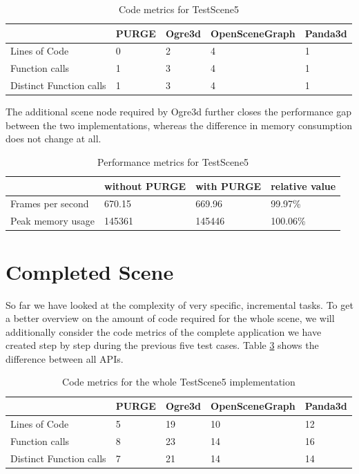 	\begin{table}[htpb]
		\center
		\caption{Code metrics for TestScene5}
		\begin{tabular}{l | l | l | l | l}
			& PURGE & Ogre3d & OpenSceneGraph & Panda3d\\ \hline
			Lines of Code & 0 & 2 & 4 & 1\\
			Function calls & 1 & 3 & 4 & 1\\
			Distinct Function calls & 1 & 3 & 4 & 1\\
		\end{tabular}
		\label{tbl:Code5}
	\end{table}

	The additional scene node required by Ogre3d further closes the performance gap between the two implementations, whereas the difference in memory consumption does not change at all.

	\begin{table}[htpb]
		\center
		\caption{Performance metrics for TestScene5}
		\begin{tabular}{l | l | l | l}
			& without PURGE & with PURGE & relative value\\ \hline
			Frames per second & 670.15 & 669.96 & 99.97\%\\
			Peak memory usage & 145361 & 145446 & 100.06\%\\
		\end{tabular}
		\label{tbl:Performance5}
	\end{table}

\section{Completed Scene}

	So far we have looked at the complexity of very specific, incremental tasks. To get a better overview on the amount of code required for the whole scene, we will additionally consider the code metrics of the complete application we have created step by step during the previous five test cases. Table \ref{tbl:Complete5} shows the difference between all APIs.

	\begin{table}[htpb]
		\center
		\caption{Code metrics for the whole TestScene5 implementation}
		\begin{tabular}{l | l | l | l | l}
			& PURGE & Ogre3d & OpenSceneGraph & Panda3d\\ \hline
			Lines of Code & 5 & 19 & 10 & 12\\
			Function calls & 8 & 23 & 14 & 16\\
			Distinct Function calls & 7 & 21 & 14 & 14\\
		\end{tabular}
		\label{tbl:Complete5}
	\end{table}


